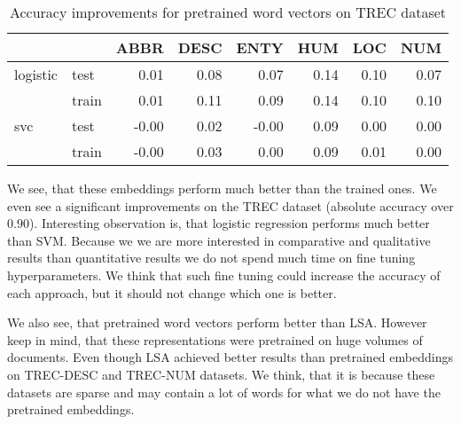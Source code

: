     
    \begin{table}[H]
    \begin{center}
    
    \begin{tabular}{llrrrrrr}
    \toprule
     &&ABBR &DESC &ENTY &HUM &LOC &NUM \\
    \midrule
    logistic & test &0.01 &0.08 &0.07 & 0.14 & 0.10 & 0.07 \\
     & train &0.01 &0.11 &0.09 & 0.14 & 0.10 & 0.10 \\
    svc & test & -0.00 &0.02 & -0.00 & 0.09 & 0.00 & 0.00 \\
     & train & -0.00 &0.03 &0.00 & 0.09 & 0.01 & 0.00 \\
    \bottomrule
    \end{tabular}
    
    \caption[Accuracy improvements for pretrained word vectors on TREC dataset]{Accuracy improvements for pretrained word vectors on TREC dataset}
    \label{tab:res:pretrainedwordvec:trec}
    \end{center}
    \end{table}

    
    We see, that these embeddings perform much better than the trained ones. 
    We even see a significant improvements on the TREC dataset (absolute accuracy over $0.90$).
    Interesting observation is, that logistic regression performs much better than SVM.
    Because we we are more interested in comparative and qualitative results than quantitative results we do not spend much time on fine tuning hyperparameters. We think that such fine tuning could increase the accuracy of each approach, but it should not change which one is better. 
    
    We also see, that pretrained word vectors perform better than LSA. 
    However keep in mind, that these representations were pretrained on huge volumes of documents.
    Even though LSA achieved better results than pretrained embeddings on TREC-DESC and TREC-NUM datasets.
    We think, that it is because these datasets are sparse and may contain a lot of words for what we do not have the pretrained embeddings.
    
